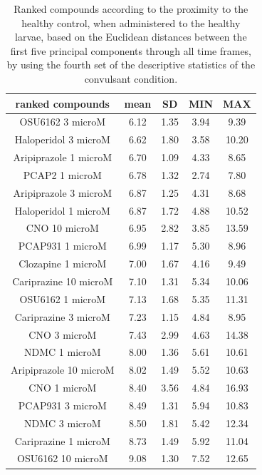 \documentclass[a4paper,12pt]{article}
\begin{document}
\begin{table}[h!]\tiny
\centering
\caption{Ranked compounds according to the proximity to the healthy control, when administered to the healthy larvae, based on the Euclidean distances between the first five principal components through all time frames, by using the fourth set of the descriptive statistics of the convulsant condition.}
\begin{tabular}{|c|c|c|c|c|}
\hline
ranked compounds             & mean & SD   & MIN  & MAX   \\ \hline
OSU6162 3 microM       & 6.12  & 1.35 & 3.94 & 9.39  \\ \hline
Haloperidol 3 microM   & 6.62  & 1.80  & 3.58 & 10.20  \\ \hline
Aripiprazole 1 microM  & 6.70   & 1.09 & 4.33 & 8.65  \\ \hline
PCAP2 1 microM         & 6.78  & 1.32 & 2.74 & 7.80   \\ \hline
Aripiprazole 3 microM  & 6.87  & 1.25 & 4.31 & 8.68  \\ \hline
Haloperidol 1 microM   & 6.87  & 1.72 & 4.88 & 10.52 \\ \hline
CNO 10 microM          & 6.95  & 2.82 & 3.85 & 13.59 \\ \hline
PCAP931 1 microM       & 6.99  & 1.17 & 5.30  & 8.96  \\ \hline
Clozapine 1 microM     & 7.00     & 1.67 & 4.16 & 9.49  \\ \hline
Cariprazine 10 microM  & 7.10   & 1.31 & 5.34 & 10.06 \\ \hline
OSU6162 1 microM       & 7.13  & 1.68 & 5.35 & 11.31 \\ \hline
Cariprazine 3 microM   & 7.23  & 1.15 & 4.84 & 8.95  \\ \hline
CNO 3 microM           & 7.43  & 2.99 & 4.63 & 14.38 \\ \hline
NDMC 1 microM          & 8.00     & 1.36 & 5.61 & 10.61 \\ \hline
Aripiprazole 10 microM & 8.02  & 1.49 & 5.52 & 10.63 \\ \hline
CNO 1 microM           & 8.40   & 3.56 & 4.84 & 16.93 \\ \hline
PCAP931 3 microM       & 8.49  & 1.31 & 5.94 & 10.83 \\ \hline
NDMC 3 microM          & 8.50   & 1.81 & 5.42 & 12.34 \\ \hline
Cariprazine 1 microM   & 8.73  & 1.49 & 5.92 & 11.04 \\ \hline
OSU6162 10 microM      & 9.08  & 1.30  & 7.52 & 12.65 \\ \hline

\end{tabular}
\end{table}
\end{document}
